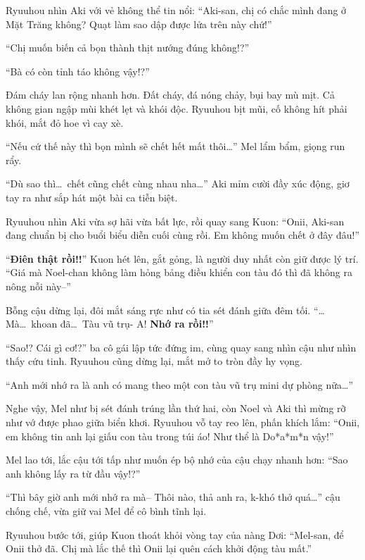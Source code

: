 \documentclass[../main.tex]{subfiles}
\begin{document}
Ryuuhou nhìn Aki với vẻ không thể tin nổi: ``Aki-san, chị có chắc mình đang ở Mặt Trăng không? Quạt làm sao dập được lửa trên này chứ!''

``Chị muốn biến cả bọn thành thịt nướng đúng không!?''

``Bà có còn tỉnh táo không vậy!?''

Đám cháy lan rộng nhanh hơn. Đất cháy, đá nóng chảy, bụi bay mù mịt. Cả không gian ngập mùi khét lẹt và khói độc. Ryuuhou bịt mũi, cố không hít phải khói, mắt đỏ hoe vì cay xè.

``Nếu cứ thế này thì bọn mình sẽ chết hết mất thôi\dots'' Mel lẩm bẩm, giọng run rẩy.

``Dù sao thì\dots\ chết cũng chết cùng nhau nha\dots'' Aki mỉm cười đầy xúc động, giơ tay ra như sắp hát một bài ca tiễn biệt.

Ryuuhou nhìn Aki vừa sợ hãi vừa bất lực, rồi quay sang Kuon: ``Onii, Aki-san đang chuẩn bị cho buổi biểu diễn cuối cùng rồi. Em không muốn chết ở đây đâu!''

``\textbf{Điên thật rồi!!}'' Kuon hét lên, gắt gỏng, là người duy nhất còn giữ được lý trí. ``Giá mà Noel-chan không làm hỏng bảng điều khiển con tàu đó thì đã không ra nông nỗi này--''

Bỗng cậu dừng lại, đôi mắt sáng rực như có tia sét đánh giữa đêm tối. ``\dots Mà\dots\ khoan đã\dots\ Tàu vũ trụ- A! \textbf{Nhớ ra rồi!!}''

``Sao!? Cái gì cơ!?'' ba cô gái lập tức đứng im, cùng quay sang nhìn cậu như nhìn thấy cứu tinh. Ryuuhou cũng dừng lại, mắt mở to tròn đầy hy vọng.

``Anh mới nhớ ra là anh có mang theo một con tàu vũ trụ mini dự phòng nữa\dots''

Nghe vậy, Mel như bị sét đánh trúng lần thứ hai, còn Noel và Aki thì mừng rỡ như vớ được phao giữa biển khơi. Ryuuhou vỗ tay reo lên, phấn khích lắm: ``Onii, em không tin anh lại giấu con tàu trong túi áo! Như thể là Do*a*m*n vậy!''


Mel lao tới, lắc cậu tới tấp như muốn ép bộ nhớ của cậu chạy nhanh hơn: ``Sao anh không lấy ra từ đầu vậy!?''

``Thì bây giờ anh mới nhớ ra mà-- Thôi nào, thả anh ra, k-khó thở quá\dots'' cậu chống chế, vừa giữ vai Mel để cô bình tĩnh lại.

Ryuuhou bước tới, giúp Kuon thoát khỏi vòng tay của nàng Dơi: ``Mel-san, để Onii thở đã. Chị mà lắc thế thì Onii lại quên cách khởi động tàu mất.''
\end{document}
